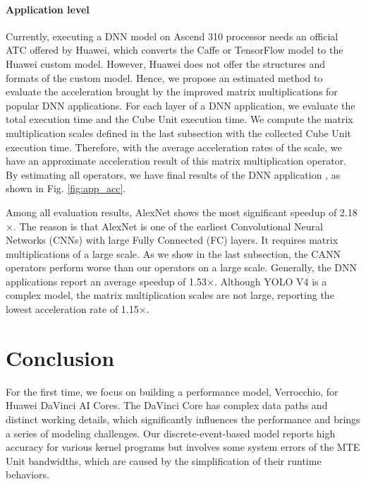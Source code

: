 \paragraph{Application level}

Currently, executing a DNN model on Ascend 310 processor needs an official ATC offered by Huawei, which converts the Caffe or TensorFlow model to the Huawei custom model. However, Huawei does not offer the structures and formats of the custom model. Hence, we propose an estimated method to evaluate the acceleration brought by the improved matrix multiplications for popular DNN applications. For each layer of a DNN application, we evaluate the total execution time and the Cube Unit execution time. We compute the matrix multiplication scales defined in the last subsection with the collected Cube Unit execution time. Therefore, with the average acceleration rates of the scale, we have an approximate acceleration result of this matrix multiplication operator. By estimating all operators, we have final results of the DNN application \cite{DBLP:conf/cvpr/HeZRS16, DBLP:journals/corr/abs-2004-10934, DBLP:conf/cvpr/SandlerHZZC18, DBLP:conf/nips/KrizhevskySH12, DBLP:conf/naacl/DevlinCLT19}, as shown in Fig. \ref{fig:app_acc}.

Among all evaluation results, AlexNet shows the most significant speedup of 2.18$\times$. The reason is that AlexNet is one of the earliest Convolutional Neural Networks (CNNs) with large Fully Connected (FC) layers. It requires matrix multiplications of a large scale. As we show in the last subsection, the CANN operators perform worse than our operators on a large scale. Generally, the DNN applications report an average speedup of 1.53$\times$. Although YOLO V4 is a complex model, the matrix multiplication scales are not large, reporting the lowest acceleration rate of 1.15$\times$.

\section{Conclusion}

For the first time, we focus on building a performance model, Verrocchio, for Huawei DaVinci AI Cores. The DaVinci Core has complex data paths and distinct working details, which significantly influences the performance and brings a series of modeling challenges. Our discrete-event-based model reports high accuracy for various kernel programs but involves some system errors of the MTE Unit bandwidths, which are caused by the simplification of their runtime behaviors.
